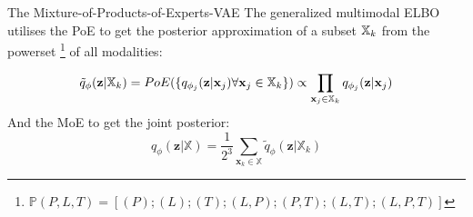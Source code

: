     \begin{frame}{The Mixture-of-Products-of-Experts-VAE}
        The generalized multimodal ELBO utilises the PoE to get the posterior approximation of a subset $\mathbb{X}_k$ from the powerset \footnote{$\mathbb{P}(P,L,T)=[(P); (L); (T); (L,P); (P,T); (L,T); (L,P,T)]$} of all modalities:

        \begin{equation}
            \tilde{q}_{\phi}(\textbf{z}|\mathbb{X}_k)=PoE(\{q_{\phi_j}(\textbf{z}|\textbf{x}_j) \forall \textbf{x}_j \in \mathbb{X}_k\}) \propto \prod _{\textbf{x}_j \in \mathbb{X}_k}q_{\phi_j}(\textbf{z}|\textbf{x}_j)
        \end{equation}
        And the MoE to get the joint posterior:
        \begin{equation}
            q_{\phi}(\textbf{z}|\mathbb{X}) = \frac{1}{2^3} \sum _{\textbf{x}_k \in \mathbb{X}} \tilde{q}_{\phi} (\textbf{z}|\mathbb{X}_k)
        \end{equation}
    \end{frame}

